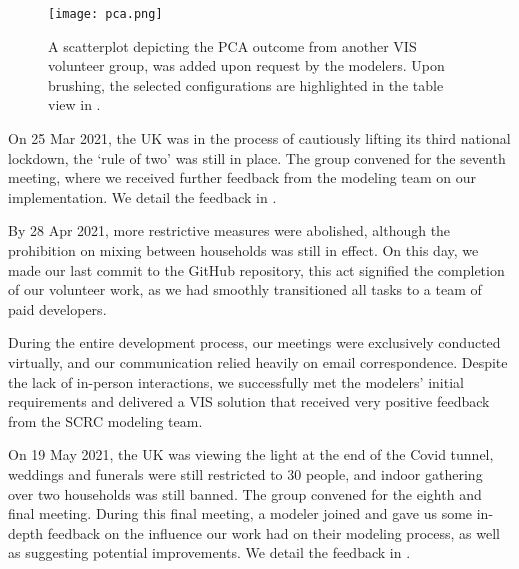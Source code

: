 \begin{figure}[tb!]
    \centering
    \texttt{[image: pca.png]}
    \caption{A scatterplot depicting the PCA outcome from another VIS volunteer group, was added upon request by the modelers. Upon brushing, the selected configurations are highlighted in the table view in .
    }
    \label{fig:pca}

\end{figure}

On 25 Mar 2021, the UK was in the process of cautiously lifting its third national lockdown, the `rule of two' was still in place.
The group convened for the seventh meeting, where we received further feedback from the modeling team on our implementation.
We detail the feedback in .


By 28 Apr 2021, more restrictive measures were abolished, although the prohibition on mixing between households was still in effect.
On this day, we made our last commit to the GitHub repository, this act signified the completion of our volunteer work, as we had smoothly transitioned all tasks to a team of paid developers.

During the entire development process, our meetings were exclusively conducted virtually, and our communication relied heavily on email correspondence.
Despite the lack of in-person interactions, we successfully met the modelers' initial requirements and delivered a \ac{VIS} solution that received very positive feedback from the SCRC modeling team.

On 19 May 2021, the UK was viewing the light at the end of the Covid tunnel, weddings and funerals were still restricted to 30 people, and indoor gathering over two households was still banned.
The group convened for the eighth and final meeting.
During this final meeting, a modeler joined and gave us some in-depth feedback on the influence our work had on their modeling process, as well as suggesting potential improvements.
We detail the feedback in .

